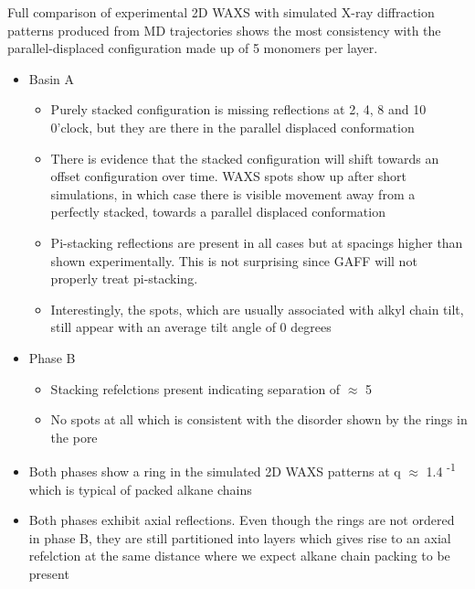 Full comparison of experimental 2D WAXS with simulated X-ray diffraction patterns produced from MD trajectories shows the most consistency with the parallel-displaced configuration made up of 5 monomers per layer.
        \begin{itemize}
                \item Basin A
                \begin{itemize}
                        \item Purely stacked configuration is missing reflections at 2, 4, 8 and 10 0'clock, but they are there in the parallel displaced conformation
                        \item There is evidence that the stacked configuration will shift towards an offset configuration over time. WAXS spots show up after short simulations, in which case there is visible movement away from a perfectly stacked, towards a parallel displaced conformation
                        \item Pi-stacking reflections are present in all cases but at spacings higher than shown experimentally. This is not surprising since GAFF will not properly treat pi-stacking.
                        \item Interestingly, the spots, which are usually associated with alkyl chain tilt, still appear with an average tilt angle of 0 degrees
                \end{itemize}
                \item Phase B
                \begin{itemize}
                        \item Stacking refelctions present indicating separation of $\approx$ 5 \angstrom
                        \item No spots at all which is consistent with the disorder shown by the rings in the pore
                \end{itemize}
                \item Both phases show a ring in the simulated 2D WAXS patterns at q $\approx$ 1.4 \angstrom \textsuperscript{-1} which is typical of packed alkane chains
                \item Both phases exhibit axial reflections. Even though the rings are not ordered in phase B,
they are still partitioned into layers which gives rise to an axial refelction at the same distance where we expect alkane chain packing to be present
        \end{itemize}


